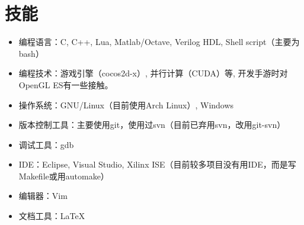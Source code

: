 \documentclass[letterpaper]{article}
\begin{document}
\section*{技能}
\begin{itemize}
    \item 编程语言：C, C++, Lua, Matlab/Octave, Verilog HDL, Shell script（主要为bash）
    \item 编程技术：游戏引擎（cocos2d-x）, 并行计算（CUDA）等, 开发手游时对OpenGL ES有一些接触。
    \item 操作系统：GNU/Linux（目前使用Arch Linux）, Windows
    \item 版本控制工具：主要使用git，使用过svn（目前已弃用svn，改用git-svn）
    \item 调试工具：gdb
    \item IDE：Eclipse, Visual Studio, Xilinx ISE（目前较多项目没有用IDE，而是写Makefile或用automake）
    \item 编辑器：Vim
    \item 文档工具：\LaTeX
\end{itemize}
\end{document}
